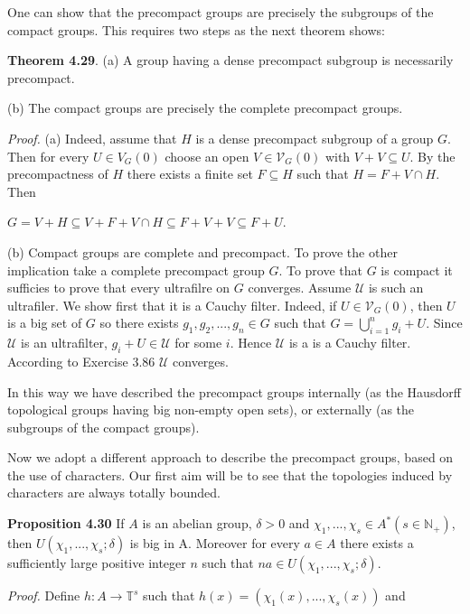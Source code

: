 \documentclass[12pt]{article}
\begin{document}
    One can show that the precompact groups are precisely the subgroups of the compact groups. This requires
two steps as the next theorem shows:


\textbf{Theorem 4.29}. (a) A group having a dense precompact subgroup is necessarily precompact.


    (b) The compact groups are precisely the complete precompact groups.


    \emph{Proof.} (a) Indeed, assume that $H$ is a dense precompact subgroup of a group $G$. Then for every $U \in V_G(0)$
choose an open $V \in \mathcal{V}_G(0)$ with $V + V \subseteq U$. By the precompactness of $H$ there exists a finite set $F \subseteq H$ such
that $H = F + V \cap H$. Then
    

    $G = V + H \subseteq V + F + V \cap H \subseteq F + V + V \subseteq F + U$.


    (b) Compact groups are complete and precompact. To prove the other implication take a complete
precompact group $G$. To prove that $G$ is compact it sufficies to prove that every ultrafilre on $G$ converges. Assume
$\mathcal{U}$ is such an ultrafiler. We show first that it is a Cauchy filter. Indeed, if $U \in \mathcal{V}_G(0)$, then $U$ is a big set of $G$
so there exists $g_1, g_2, . . . , g_n \in G$ such that $G =\bigcup^n_{i=1} g_i + U$. Since $\mathcal{U}$ is an ultrafilter, $g_i + U \in \mathcal{U}$ for some $i$.
Hence $\mathcal{U}$ is a is a Cauchy filter. According to Exercise 3.86 $\mathcal{U}$ converges.


    In this way we have described the precompact groups internally (as the Hausdorff topological groups having
big non-empty open sets), or externally (as the subgroups of the compact groups).


    Now we adopt a different approach to describe the precompact groups, based on the use of characters. Our
first aim will be to see that the topologies induced by characters are always totally bounded.


\textbf{Proposition 4.30} If $A$ is an abelian group, $\delta > 0$ and $\chi_1, . . . , \chi_s \in A^*(s \in \mathbb{N}_+)$, then $U(\chi_1, . . . , \chi_s; \delta)$ is big in
A. Moreover for every $a \in A$ there exists a sufficiently large positive integer $n$ such that $na \in U(\chi_1, . . . , \chi_s; \delta)$.


    \emph{Proof.} Define $h : A \to \mathbb{T}^s$ such that $h(x) = (\chi_1(x), . . . , \chi_s(x))$ and
\end{document}
